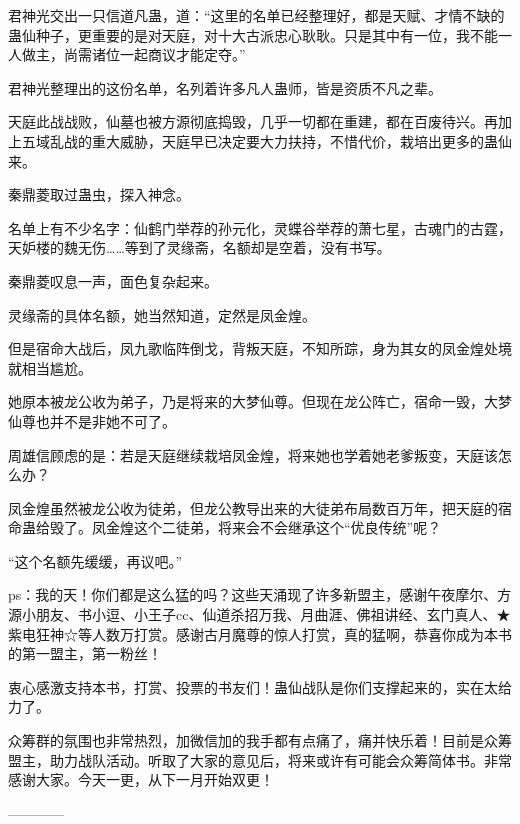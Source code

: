 \begin{this_body}
君神光交出一只信道凡蛊，道：“这里的名单已经整理好，都是天赋、才情不缺的蛊仙种子，更重要的是对天庭，对十大古派忠心耿耿。只是其中有一位，我不能一人做主，尚需诸位一起商议才能定夺。”

君神光整理出的这份名单，名列着许多凡人蛊师，皆是资质不凡之辈。

天庭此战战败，仙墓也被方源彻底捣毁，几乎一切都在重建，都在百废待兴。再加上五域乱战的重大威胁，天庭早已决定要大力扶持，不惜代价，栽培出更多的蛊仙来。

秦鼎菱取过蛊虫，探入神念。

名单上有不少名字：仙鹤门举荐的孙元化，灵蝶谷举荐的萧七星，古魂门的古霆，天妒楼的魏无伤……等到了灵缘斋，名额却是空着，没有书写。

秦鼎菱叹息一声，面色复杂起来。

灵缘斋的具体名额，她当然知道，定然是凤金煌。

但是宿命大战后，凤九歌临阵倒戈，背叛天庭，不知所踪，身为其女的凤金煌处境就相当尴尬。

她原本被龙公收为弟子，乃是将来的大梦仙尊。但现在龙公阵亡，宿命一毁，大梦仙尊也并不是非她不可了。

周雄信顾虑的是：若是天庭继续栽培凤金煌，将来她也学着她老爹叛变，天庭该怎么办？

凤金煌虽然被龙公收为徒弟，但龙公教导出来的大徒弟布局数百万年，把天庭的宿命蛊给毁了。凤金煌这个二徒弟，将来会不会继承这个“优良传统”呢？

“这个名额先缓缓，再议吧。”

ps：我的天！你们都是这么猛的吗？这些天涌现了许多新盟主，感谢午夜摩尔、方源小朋友、书小逗、小王子cc、仙道杀招万我、月曲涯、佛祖讲经、玄门真人、★紫电狂神☆等人数万打赏。感谢古月魔尊的惊人打赏，真的猛啊，恭喜你成为本书的第一盟主，第一粉丝！

衷心感激支持本书，打赏、投票的书友们！蛊仙战队是你们支撑起来的，实在太给力了。

众筹群的氛围也非常热烈，加微信加的我手都有点痛了，痛并快乐着！目前是众筹盟主，助力战队活动。听取了大家的意见后，将来或许有可能会众筹简体书。非常感谢大家。今天一更，从下一月开始双更！

------------

\end{this_body}

